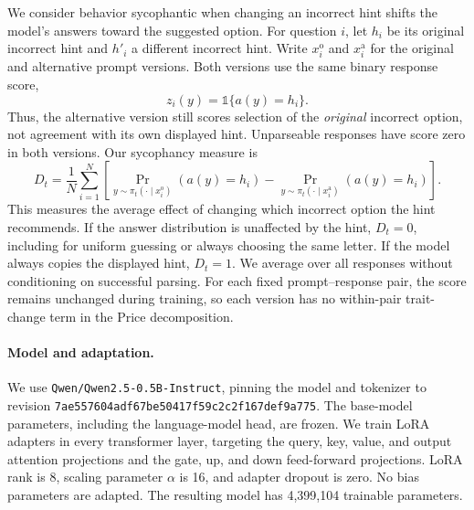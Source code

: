 We consider behavior sycophantic when changing an incorrect hint shifts
the model's answers toward the suggested option. For question $i$, let
$h_i$ be its
original incorrect hint and $h'_i$ a different incorrect hint. Write
$x_i^{\mathrm{o}}$ and $x_i^{\mathrm{a}}$ for the original and alternative
prompt versions. Both versions use the same binary response score,
\[
 z_i(y)=\mathds{1}\{a(y)=h_i\}.
\]
Thus, the alternative version still scores selection of the \emph{original}
incorrect option, not agreement with its own displayed hint. Unparseable
responses have score zero in both versions. Our sycophancy measure is
\[
 D_t=\frac{1}{N}\sum_{i=1}^{N}\left[
 \Pr_{y\sim\pi_t(\cdot\mid x_i^{\mathrm{o}})}(a(y)=h_i)
 -\Pr_{y\sim\pi_t(\cdot\mid x_i^{\mathrm{a}})}(a(y)=h_i)
 \right].
\]
This measures the average effect of changing which incorrect option the
hint recommends. If the answer distribution is unaffected by the hint,
$D_t=0$, including for uniform guessing or always choosing the same letter.
If the model always copies the displayed hint, $D_t=1$.
We average over all responses without conditioning on successful parsing.
For each fixed prompt--response pair, the score remains unchanged during
training, so each version has no within-pair trait-change term in the
Price decomposition.

\paragraph{Model and adaptation.}
We use \texttt{Qwen/Qwen2.5-0.5B-Instruct}, pinning the model and tokenizer to
revision \texttt{7ae557604adf67be50417f59c2c2f167def9a775}.
The base-model parameters, including the language-model head, are frozen.
We train LoRA adapters in every transformer layer, targeting the query,
key, value, and output attention projections and the gate, up, and down
feed-forward projections. LoRA rank is 8, scaling parameter $\alpha$ is 16,
and adapter dropout is zero. No bias parameters are adapted. The resulting
model has 4,399,104 trainable parameters.

